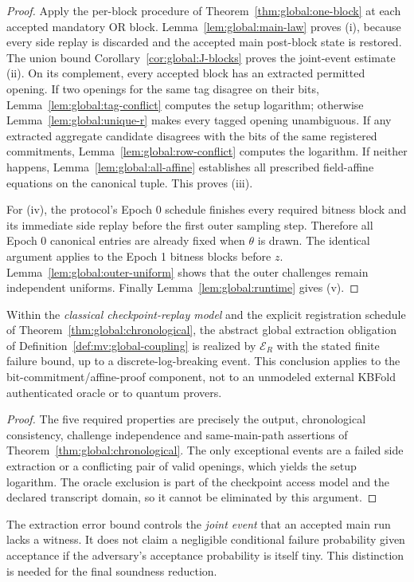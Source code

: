 \begin{proof}
Apply the per-block procedure
of Theorem~\ref{thm:global:one-block}
at each accepted mandatory OR block.
Lemma~\ref{lem:global:main-law}
proves (i), because every side
replay is discarded and the
accepted main post-block state
is restored. The union bound
Corollary~\ref{cor:global:J-blocks}
proves the joint-event estimate
(ii). On its complement,
every accepted block has an
extracted permitted opening.
If two openings for the same
tag disagree on their bits,
Lemma~\ref{lem:global:tag-conflict}
computes the setup logarithm;
otherwise Lemma~\ref{lem:global:unique-r}
makes every tagged opening
unambiguous. If any extracted
aggregate candidate disagrees
with the bits of the same
registered commitments,
Lemma~\ref{lem:global:row-conflict}
computes the logarithm.
If neither happens,
Lemma~\ref{lem:global:all-affine}
establishes all prescribed
field-affine equations on
the canonical tuple. This
proves (iii).

For (iv), the protocol's Epoch 0
schedule finishes every required
bitness block and its immediate
side replay before the first
outer sampling step. Therefore
all Epoch 0 canonical entries are
already fixed when $\theta$
is drawn. The identical argument
applies to the Epoch 1 bitness
blocks before $z$.
Lemma~\ref{lem:global:outer-uniform}
shows that the outer challenges
remain independent uniforms.
Finally Lemma~\ref{lem:global:runtime}
gives (v).
\end{proof}

\begin{corollary}\label{cor:global:discharged}
Within the \emph{classical checkpoint-replay
model} and the explicit registration schedule
of Theorem~\ref{thm:global:chronological},
the abstract global extraction obligation
of Definition~\ref{def:mv:global-coupling}
is realized by $\mathcal E_R$ with
the stated finite failure bound,
up to a discrete-log-breaking event.
This conclusion applies to the
bit-commitment/affine-proof component,
not to an unmodeled external KBFold
authenticated oracle or to quantum provers.
\end{corollary}
\begin{proof}
The five required properties
are precisely the output,
chronological consistency,
challenge independence and
same-main-path assertions of
Theorem~\ref{thm:global:chronological}.
The only exceptional events
are a failed side extraction
or a conflicting pair of
valid openings, which yields
the setup logarithm.
The oracle exclusion is part
of the checkpoint access model
and the declared transcript
domain, so it cannot be
eliminated by this argument.
\end{proof}

\begin{remark}
The extraction error bound controls
the \emph{joint event} that an
accepted main run lacks a witness.
It does not claim a negligible
conditional failure probability
given acceptance if the adversary's
acceptance probability is itself
tiny. This distinction is needed
for the final soundness reduction.
\end{remark}
